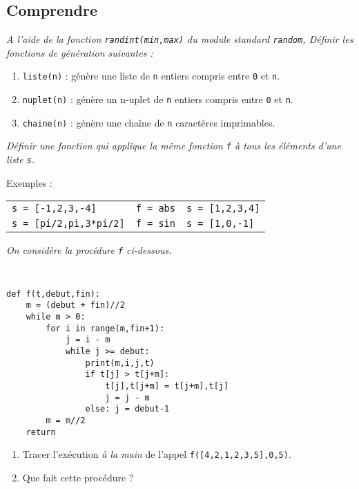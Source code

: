 \subsection{Comprendre}
\begin{td}\label{td:alea}
\em
A l'aide de la fonction {\tt randint(min,max)} du module standard {\tt random},
Définir les fonctions de génération suivantes :
\begin{enumerate}
\item {\tt liste(n)} : génère une liste de {\tt n} entiers compris entre {\tt 0} et {\tt n}.
\item {\tt nuplet(n)} : génère un n-uplet de {\tt n} entiers compris entre {\tt 0} et {\tt n}.
\item {\tt chaine(n)} : génère une chaîne de {\tt n} caractères imprimables.
\end{enumerate}
\end{td}

\begin{td}\label{td:foreach}
\em
Définir une fonction qui applique la même fonction {\tt f} à tous les éléments d'une liste {\tt s}.

Exemples : 
\begin{tabular}[t]{l@{ , }l@{ $\rightarrow$ }l}
{\tt s = [-1,2,3,-4]}		& {\tt f = abs} & {\tt s = [1,2,3,4]}\\
{\tt s = [pi/2,pi,3*pi/2]}	& {\tt f = sin} & {\tt s = [1,0,-1]}
\end{tabular}
\end{td}


\begin{td}\label{td:trishell}
\em
On considère la procédure {\tt f} ci-dessous.

\noindent\mbox{}\hspace*{1cm}\begin{py}{7cm}\tt
\begin{verbatim}
def f(t,debut,fin):
    m = (debut + fin)//2
    while m > 0:
        for i in range(m,fin+1):
            j = i - m
            while j >= debut:
                print(m,i,j,t)
                if t[j] > t[j+m]:
                    t[j],t[j+m] = t[j+m],t[j]
                    j = j - m
                else: j = debut-1
        m = m//2
    return 
\end{verbatim}
\end{py}

\vspace*{2mm}

\begin{enumerate}
\item Tracer l'exécution {\em à la main} de l'appel {\tt f([4,2,1,2,3,5],0,5)}.
\item Que fait cette procédure ?
\end{enumerate}

\end{td}

